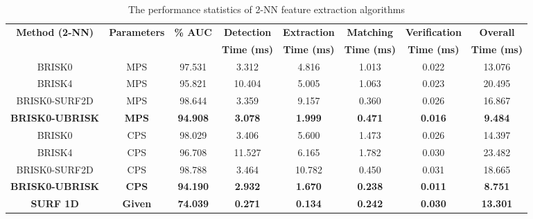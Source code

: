\documentclass{report}
\begin{document}
\begin{table}
\centering
\caption{The performance statistics of 2-NN feature extraction algorithms}
\footnotesize
\begin{tabular}{|c|c|c|c|c|c|c|c|}
\hline 
\textbf{Method (2-NN)} & \textbf{Parameters} & \textbf{\% AUC} & \textbf{Detection} & \textbf{Extraction} & \textbf{Matching} & \textbf{Verification} & \textbf{Overall}\tabularnewline
 &  &  & \textbf{Time (ms)} & \textbf{Time (ms)} & \textbf{Time (ms)} & \textbf{Time (ms)} & \textbf{Time (ms)}\tabularnewline
\hline 
\hline 
BRISK0 & MPS & 97.531 & 3.312 & 4.816 & 1.013 & 0.022 & 13.076\tabularnewline
\hline 
BRISK4 & MPS & 95.821 & 10.404 & 5.005 & 1.063 & 0.023 & 20.495\tabularnewline
\hline 
BRISK0-SURF2D & MPS & 98.644 & 3.359 & 9.157 & 0.360 & 0.026 & 16.867\tabularnewline
\hline 
\textbf{BRISK0-UBRISK} & \textbf{MPS} & \textbf{94.908} & \textbf{3.078} & \textbf{1.999} & \textbf{0.471} & \textbf{0.016} & \textbf{9.484}\tabularnewline
\hline 
BRISK0 & CPS & 98.029 & 3.406 & 5.600 & 1.473 & 0.026 & 14.397\tabularnewline
\hline 
BRISK4 & CPS & 96.708 & 11.527 & 6.165 & 1.782 & 0.030 & 23.482\tabularnewline
\hline 
BRISK0-SURF2D & CPS & 98.788 & 3.464 & 10.782 & 0.450 & 0.031 & 18.665\tabularnewline
\hline 
\textbf{BRISK0-UBRISK} & \textbf{CPS} & \textbf{94.190} & \textbf{2.932} & \textbf{1.670} & \textbf{0.238} & \textbf{0.011} & \textbf{8.751}\tabularnewline
\hline 
\textbf{SURF 1D} & \textbf{Given} & \textbf{74.039} & \textbf{0.271} & \textbf{0.134} & \textbf{0.242} & \textbf{0.030} & \textbf{13.301}\tabularnewline
\hline 
\end{tabular}
\label{tab:mrd_times_knn}
\end{table}
\end{document}
